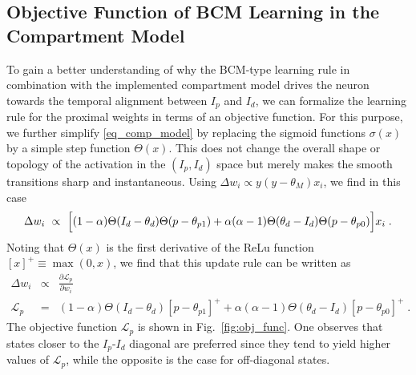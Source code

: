 \documentclass[utf8]{frontiersSCNS} %
\begin{document}
\subsection{Objective Function of BCM Learning in the Compartment Model}
\label{sect:Obj_Func}

To gain a better understanding of why the BCM-type 
learning rule in combination with the implemented 
compartment model drives the neuron towards 
the temporal alignment between $I_p$ and $I_d$, 
we can formalize the learning rule for the 
proximal weights in terms of an objective function.
For this purpose, we further simplify 
\eqref{eq_comp_model} by replacing the sigmoid 
functions $\sigma(x)$ by a simple step 
function $\Theta(x)$. This does not change the 
overall shape or topology of the activation
in the $(I_p,I_d)$ space but merely makes the 
smooth transitions sharp and instantaneous. 
Using $\Delta w_i \propto y\left(y - \theta_M \right) x_i$,
we find in this case
\begin{equation}
\Delta w_i \ \propto\  
\Big[ (1-\alpha) \Theta(I_d - \theta_{d})\Theta(p-\theta_{p1})
\\ + \alpha (\alpha - 1)\Theta(\theta_{d} - I_d)\Theta(p-\theta_{p0}) 
\Big]x_i \; .
\end{equation}
Noting that $\Theta(x)$ is the first derivative 
of the ReLu function $[x]^+ \equiv \max(0,x)$,
we find that this update rule can be written as
\begin{eqnarray}
\nonumber
\Delta w_i &\propto&
\frac{\partial \mathcal{L}_p}{\partial w_i}\\
\mathcal{L}_p &=& (1-\alpha) \Theta(I_d - 
\theta_{d})[p-\theta_{p1}]^+
+ \alpha (\alpha - 1)\Theta(\theta_{d} - I_d)[p-\theta_{p0}]^+ \; .
\label{eq_obj_func}
\end{eqnarray}
The objective function $\mathcal{L}_p$
is shown in Fig.~\ref{fig:obj_func}. 
One observes that states closer to 
the $I_p$-$I_d$ diagonal are preferred since
they tend to yield higher values of $\mathcal{L}_p$,
while the opposite is the case for off-diagonal 
states.
\end{document}

